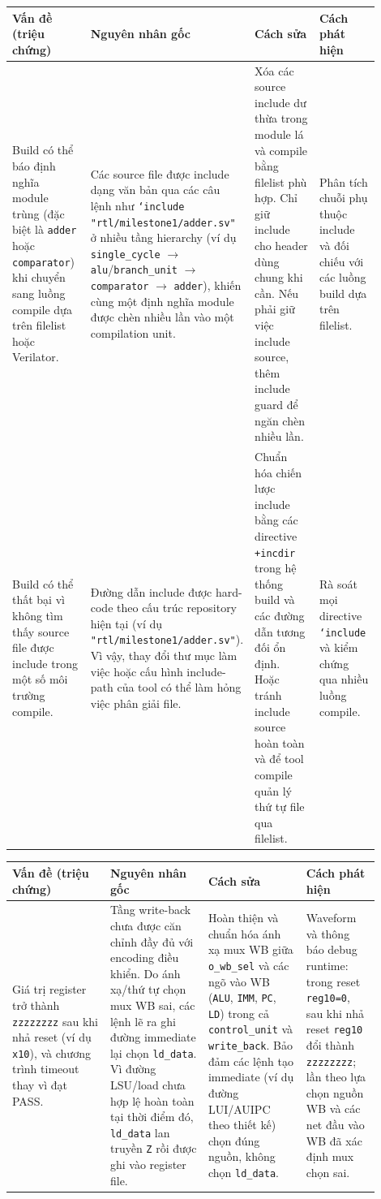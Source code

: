\documentclass[10pt,a4paper]{article}
\begin{document}
\begin{center}
\small
\begin{tabular}{@{}p{0.24\linewidth}p{0.24\linewidth}p{0.24\linewidth}p{0.18\linewidth}@{}}
\toprule
\textbf{Vấn đề (triệu chứng)} & \textbf{Nguyên nhân gốc} & \textbf{Cách sửa} & \textbf{Cách phát hiện} \\
\midrule
Build có thể báo định nghĩa module trùng (đặc biệt là \texttt{adder} hoặc \texttt{comparator}) khi chuyển sang luồng compile dựa trên filelist hoặc Verilator. &
Các source file được include dạng văn bản qua các câu lệnh như \texttt{`include "rtl/milestone1/adder.sv"} ở nhiều tầng hierarchy (ví dụ \texttt{single\_cycle} $\rightarrow$ \texttt{alu}/\texttt{branch\_unit} $\rightarrow$ \texttt{comparator} $\rightarrow$ \texttt{adder}), khiến cùng một định nghĩa module được chèn nhiều lần vào một compilation unit. &
Xóa các source include dư thừa trong module lá và compile bằng filelist phù hợp. Chỉ giữ include cho header dùng chung khi cần. Nếu phải giữ việc include source, thêm include guard để ngăn chèn nhiều lần. &
Phân tích chuỗi phụ thuộc include và đối chiếu với các luồng build dựa trên filelist. \\
\addlinespace
Build có thể thất bại vì không tìm thấy source file được include trong một số môi trường compile. &
Đường dẫn include được hard-code theo cấu trúc repository hiện tại (ví dụ \texttt{"rtl/milestone1/adder.sv"}). Vì vậy, thay đổi thư mục làm việc hoặc cấu hình include-path của tool có thể làm hỏng việc phân giải file. &
Chuẩn hóa chiến lược include bằng các directive \texttt{+incdir} trong hệ thống build và các đường dẫn tương đối ổn định. Hoặc tránh include source hoàn toàn và để tool compile quản lý thứ tự file qua filelist. &
Rà soát mọi directive \texttt{`include} và kiểm chứng qua nhiều luồng compile. \\
\bottomrule
\end{tabular}

\begin{tabular}{@{}p{0.24\linewidth}p{0.24\linewidth}p{0.24\linewidth}p{0.18\linewidth}@{}} \toprule \textbf{Vấn đề (triệu chứng)} & \textbf{Nguyên nhân gốc} & \textbf{Cách sửa} & \textbf{Cách phát hiện} \\ \midrule Giá trị register trở thành \texttt{zzzzzzzz} sau khi nhả reset (ví dụ \texttt{x10}), và chương trình timeout thay vì đạt PASS. & Tầng write-back chưa được căn chỉnh đầy đủ với encoding điều khiển. Do ánh xạ/thứ tự chọn mux WB sai, các lệnh lẽ ra ghi đường immediate lại chọn \texttt{ld\_data}. Vì đường LSU/load chưa hợp lệ hoàn toàn tại thời điểm đó, \texttt{ld\_data} lan truyền \texttt{Z} rồi được ghi vào register file. & Hoàn thiện và chuẩn hóa ánh xạ mux WB giữa \texttt{o\_wb\_sel} và các ngõ vào WB (\texttt{ALU}, \texttt{IMM}, \texttt{PC}, \texttt{LD}) trong cả \texttt{control\_unit} và \texttt{write\_back}. Bảo đảm các lệnh tạo immediate (ví dụ đường LUI/AUIPC theo thiết kế) chọn đúng nguồn, không chọn \texttt{ld\_data}. & Waveform và thông báo debug runtime: trong reset \texttt{reg10=0}, sau khi nhả reset \texttt{reg10} đổi thành \texttt{zzzzzzzz}; lần theo lựa chọn nguồn WB và các net đầu vào WB đã xác định mux chọn sai. \\ \bottomrule \end{tabular}


\end{center}
\end{document}
